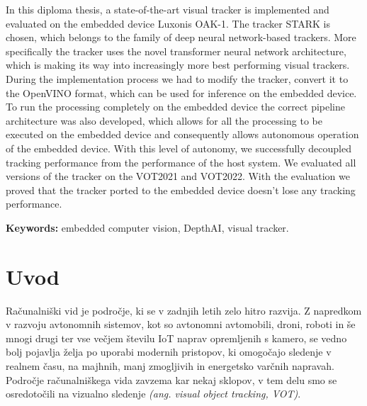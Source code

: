 \documentclass[a4paper,12pt,openright]{book}
\newcommand{\tkeywordsEn}{embedded computer vision, DepthAI, visual tracker}
\newcommand{\clearemptydoublepage}{\newpage{\pagestyle{empty}\cleardoublepage}}
\begin{document}
\noindent In this diploma thesis, a state-of-the-art visual tracker is implemented and evaluated on the embedded device Luxonis OAK-1. The tracker STARK is chosen, which belongs to the family of deep neural network-based trackers. More specifically the tracker uses the novel transformer neural network architecture, which is making its way into increasingly more best performing visual trackers. During the implementation process we had to modify the tracker, convert it to the OpenVINO format, which can be used for inference on the embedded device. To run the processing completely on the embedded device the correct pipeline architecture was also developed, which allows for all the processing to be executed on the embedded device and consequently allows autonomous operation of the embedded device. With this level of autonomy, we successfully decoupled tracking performance from the performance of the host system. We evaluated all versions of the tracker on the VOT2021 and VOT2022. With the evaluation we proved that the tracker ported to the embedded device doesn't lose any tracking performance.
\bigskip

\noindent\textbf{Keywords:} \tkeywordsEn.
\clearemptydoublepage

\mainmatter
\setcounter{page}{1}
\pagestyle{fancy}

\chapter{Uvod}
Računalniški vid je področje, ki se v zadnjih letih zelo hitro razvija. Z napredkom v razvoju avtonomnih sistemov, kot so avtonomni avtomobili, droni, roboti in še mnogi drugi ter vse večjem številu IoT naprav opremljenih s kamero, se vedno bolj pojavlja želja po uporabi modernih pristopov, ki omogočajo sledenje v realnem času, na majhnih, manj zmogljivih in energetsko varčnih napravah. Področje računalniškega vida zavzema kar nekaj sklopov, v tem delu smo se osredotočili na vizualno sledenje \emph{(ang. visual object tracking, VOT)}.
\end{document}

